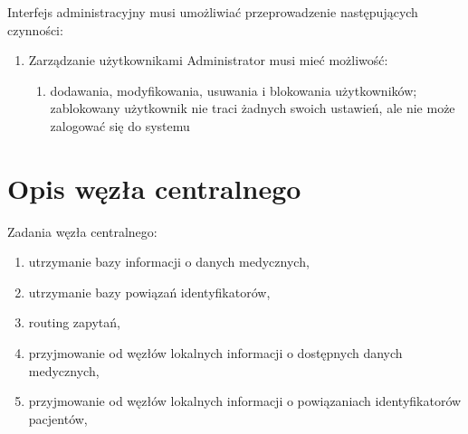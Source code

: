 \documentclass[a4paper]{report}
\begin{document}
Interfejs administracyjny musi umożliwiać przeprowadzenie następujących czynności:
\begin{enumerate}
  \item Zarządzanie użytkownikami
        Administrator musi mieć możliwość:
        \begin{enumerate}
          \item dodawania, modyfikowania, usuwania i blokowania użytkowników; zablokowany użytkownik nie traci
          żadnych swoich ustawień, ale nie może zalogować się do systemu
          
        \end{enumerate}

  
\end{enumerate}


\section{Opis węzła centralnego}
Zadania węzła centralnego:
\begin{enumerate}
\item utrzymanie bazy informacji o danych medycznych,
\item utrzymanie bazy powiązań identyfikatorów,
\item routing zapytań,
\item przyjmowanie od węzłów lokalnych informacji o dostępnych danych medycznych,
\item przyjmowanie od węzłów lokalnych informacji o powiązaniach identyfikatorów pacjentów,
\end{enumerate}
\end{document}
